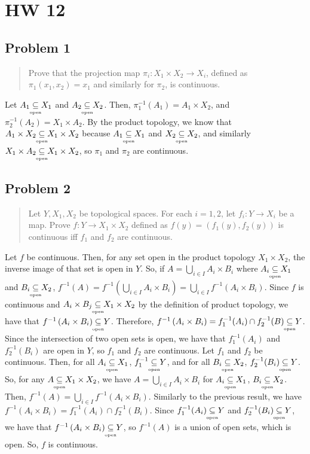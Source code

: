 \documentclass[8pt]{extarticle}
\newcommand{\open}{\underset{\clap{\tiny open}}{\subseteq}}
\begin{document}
{\section*{HW 12}%

\subsection*{Problem 1}%

\begin{quote}
	Prove that the projection map $\pi_{i}: X_{1}\times X_{2} \rightarrow X_{i}$, defined as $\pi_{1}(x_{1},x_{2}) = x_{1}$ and similarly for $\pi_{2}$, is continuous.
\end{quote}
Let $A_{1}\open X_{1}$ and $A_{2}\open X_{2}$. Then, $\pi_{1}^{-1}(A_{1}) = A_{1}\times X_{2}$, and $\pi_{2}^{-1}(A_2) = X_{1}\times A_{2}$. By the product topology, we know that $A_{1}\times X_{2}\open X_{1}\times X_{2}$ because $A_{1}\open X_{1}$ and $X_{2}\open X_{2}$, and similarly $X_{1}\times A_{2} \open X_{1}\times X_{2}$, so $\pi_{1}$ and $\pi_2$ are continuous.
\subsection*{Problem 2}%

\begin{quote}
	Let $Y,X_1,X_2$ be topological spaces. For each $i = 1,2$, let $f_{i}:Y\rightarrow X_{i}$ be a map. Prove $f:Y\rightarrow X_{1}\times X_{2}$ defined as $f(y) = (f_1(y),f_2(y))$ is continuous iff $f_1$ and $f_2$ are continuous.
\end{quote}
Let $f$ be continuous. Then, for any set open in the product topology $X_{1}\times X_{2}$, the inverse image of that set is open in $Y$. So, if $A = \bigcup_{i\in I}A_{i}\times B_{i}$ where $A_{i}\open X_{1}$ and $B_{i} \open X_{2}$, $f^{-1}(A) = f^{-1}\left(\bigcup_{i\in I}A_{i}\times B_{i}\right) = \bigcup_{i\in I}f^{-1}\left(A_{i}\times B_{i}\right)$. Since $f$ is continuous and $A_{i}\times B_{j}\open X_{1}\times X_{2}$ by the definition of product topology, we have that $f^{-1}\left(A_{i}\times B_{i}\right) \open Y$. Therefore, $f^{-1}\left(A_{i}\times B_{i}\right) = f_{1}^{-1}(A_{i})\cap f_{2}^{-1}(B) \open Y$. Since the intersection of two open sets is open, we have that $f_{1}^{-1}(A_i)$ and $f_2^{-1}(B_i)$ are open in $Y$, so $f_{1}$ and $f_{2}$ are continuous. \newline
\newline
Let $f_{1}$ and $f_{2}$ be continuous. Then, for all $A_{i}\open X_{1}$, $f_1^{-1}\open Y$, and for all $B_{i}\open X_{2}$, $f_{2}^{-1}(B_i)\open Y$. So, for any $A\open X_{1}\times X_{2}$, we have $A = \bigcup_{i\in I}A_{i}\times B_{i}$ for $A_{i}\open X_{1}$, $B_{i}\open X_{2}$. Then, $f^{-1}(A) = \bigcup_{i\in I}f^{-1}\left(A_{i}\times B_{i}\right)$. Similarly to the previous result, we have $f^{-1}(A_{i}\times B_{i}) = f_{1}^{-1}(A_{i})\cap f_{2}^{-1}(B_i)$. Since $f_{1}^{-1}(A_i)\open Y$ and $f_{2}^{-1}(B_i)\open Y$, we have that $f^{-1}\left(A_{i}\times B_{i}\right)\open Y$, so $f^{-1}(A)$ is a union of open sets, which is open. So, $f$ is continuous.
}
\end{document}
